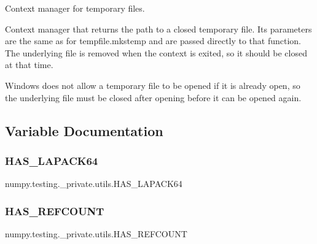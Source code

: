 \begin{DoxyVerb}Context manager for temporary files.

Context manager that returns the path to a closed temporary file. Its
parameters are the same as for tempfile.mkstemp and are passed directly
to that function. The underlying file is removed when the context is
exited, so it should be closed at that time.

Windows does not allow a temporary file to be opened if it is already
open, so the underlying file must be closed after opening before it
can be opened again.\end{DoxyVerb}
 

\subsection{Variable Documentation}
\mbox{\label{namespacenumpy_1_1testing_1_1__private_1_1utils_aa751740baa9c3ecdb67319506a3002bd}} 
\subsubsection{\texorpdfstring{H\+A\+S\+\_\+\+L\+A\+P\+A\+C\+K64}{HAS\_LAPACK64}}
{\footnotesize\ttfamily numpy.\+testing.\+\_\+private.\+utils.\+H\+A\+S\+\_\+\+L\+A\+P\+A\+C\+K64}

\mbox{\label{namespacenumpy_1_1testing_1_1__private_1_1utils_a796c1e504358d9515dbb96695bbde581}} 
\subsubsection{\texorpdfstring{H\+A\+S\+\_\+\+R\+E\+F\+C\+O\+U\+NT}{HAS\_REFCOUNT}}
{\footnotesize\ttfamily numpy.\+testing.\+\_\+private.\+utils.\+H\+A\+S\+\_\+\+R\+E\+F\+C\+O\+U\+NT}

